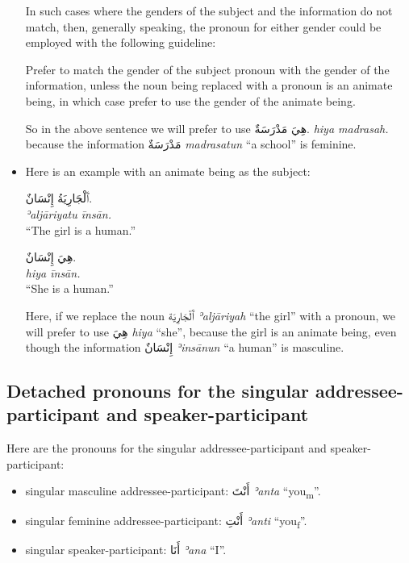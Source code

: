 \documentclass[
  10pt,
]{book}
\providecommand{\tightlist}{%
  \setlength{\itemsep}{0pt}\setlength{\parskip}{0pt}}
\begin{document}
\begin{itemize}
  In such cases where the genders of the subject and the information do not match, then, generally speaking, the pronoun for either gender could be employed with the following guideline:

  Prefer to match the gender of the subject pronoun with the gender of the information, unless the noun being replaced with a pronoun is an animate being, in which case prefer to use the gender of the animate being.

  So in the above sentence we will prefer to use \foreignlanguage{arabic}{هِيَ مَدْرَسَةٌ.} \emph{hiya madrasah.} because the information \foreignlanguage{arabic}{مَدْرَسَةٌ} \emph{madrasatun} \enquote{a school} is feminine.
\item
  Here is an example with an animate being as the subject:

  \foreignlanguage{arabic}{ٱَلْجَارِيَةُ إِنْسَانٌ.}\\
  \emph{ʾaljāriyatu īnsān.}\\
  \enquote{The girl is a human.}

  \foreignlanguage{arabic}{هِيَ إِنْسَانٌ.}\\
  \emph{hiya īnsān.}\\
  \enquote{She is a human.}

  Here, if we replace the noun \foreignlanguage{arabic}{ٱَلْجَارِيَة} \emph{ʾaljāriyah} \enquote{the girl} with a pronoun, we will prefer to use \foreignlanguage{arabic}{هِيَ} \emph{hiya} \enquote{she}, because the girl is an animate being, even though the information \foreignlanguage{arabic}{إِنْسَانٌ} \emph{ʾinsānun} \enquote{a human} is masculine.
\end{itemize}

\subsection{Detached pronouns for the singular addressee-participant and speaker-participant}\label{detached-pronouns-for-the-singular-addressee-participant-and-speaker-participant}

Here are the pronouns for the singular addressee-participant and speaker-participant:

\begin{itemize}
\tightlist
\item
  singular masculine addressee-participant: \foreignlanguage{arabic}{أَنْتَ} \emph{ʾanta} \enquote{you\textsubscript{m}}.
\item
  singular feminine addressee-participant: \foreignlanguage{arabic}{أَنْتِ} \emph{ʾanti} \enquote{you\textsubscript{f}}.
\item
  singular speaker-participant: \foreignlanguage{arabic}{أَنَا} \emph{ʾana} \enquote{I}.
\end{itemize}
\end{document}
